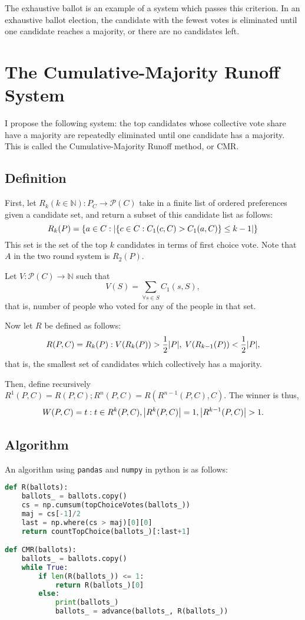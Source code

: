 \documentclass{article}
\newcommand{\N}{\mathds{N}}
\begin{document}
The exhaustive ballot is an example of a system which passes this criterion. In an exhaustive ballot election, the candidate with the fewest votes is eliminated until one candidate reaches a majority, or there are no candidates left. %

\section{The Cumulative-Majority Runoff System}
I propose the following system: the top candidates whose collective vote share have a majority are repeatedly eliminated until one candidate has a majority. This is called the Cumulative-Majority Runoff method, or CMR.

\subsection{Definition}

First, let $R_k (k\in \N): P_C \to \mathcal{P}(C) $ take in a finite list of ordered preferences given a candidate set, and return a subset of this candidate list as follows:
$$ R_k(P) = \qty{a\in C  :  \abs{\qty{c\in C: C_1(c, C) > C_1(a, C)} \leq k-1}} $$
This set is the set of the top $k$ candidates in terms of first choice vote. Note that $A$ in the two round system is $R_2(P)$.

Let $V: \mathcal{P}(C) \to \N$ such that 
$$V(S) = \sum_{\forall s \in S} C_1(s, S),$$
that is, number of people who voted for any of the people in that set.

Now let $R$ be defined as follows:
$$R(P, C) = R_k(P) : V(R_k(P))>\frac{1}{2}\abs{P},\; V(R_{k-1}(P))<\frac{1}{2}\abs{P},$$
that is, the smallest set of candidates which collectively has a majority.

Then, define recursively $R^1(P,C) = R(P,C); R^n(P, C) = R(R^{n-1}(P, C), C).$ The winner is thus, $$W(P, C) = t: t\in R^k(P,C), \abs{R^k(P,C)} = 1, \abs{R^{k-1}(P,C)} > 1.$$

\subsection{Algorithm}

An algorithm using \texttt{pandas} and \texttt{numpy} in python is as follows:
\begin{lstlisting}[language=Python]
def R(ballots):
    ballots_ = ballots.copy()
    cs = np.cumsum(topChoiceVotes(ballots_))
    maj = cs[-1]/2
    last = np.where(cs > maj)[0][0]
    return countTopChoice(ballots_)[:last+1]

def CMR(ballots):
    ballots_ = ballots.copy()
    while True:
        if len(R(ballots_)) <= 1:
            return R(ballots_)[0]
        else:
            print(ballots_)
            ballots_ = advance(ballots_, R(ballots_))
\end{lstlisting}
\end{document}
